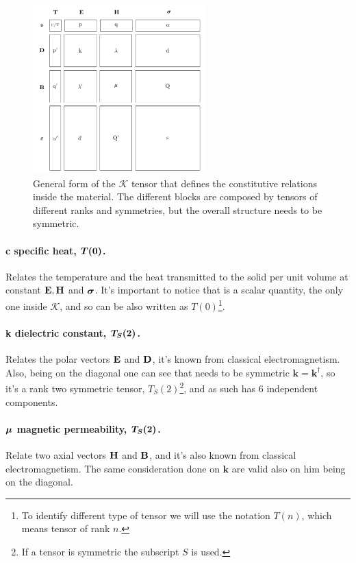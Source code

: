 \begin{figure}[t]
    \centering
    \includegraphics[width=0.6\textwidth]{Immagini/TabellaK.pdf}
    \caption{
        General form of the $\mathcal{K}$ tensor that defines the constitutive relations inside the material. The different blocks are composed by tensors of different ranks and symmetries, but the overall structure needs to be symmetric.
    }
    \label{fig:tensorK}
\end{figure}

\paragraph{c specific heat, $\vb*{T(0)}$.} Relates the temperature and the heat transmitted to the solid per unit volume at constant $\vb{E}, \vb{H}$ and $\vb*{\sigma}$. It's important to notice that is a scalar quantity, the only one inside $\mathcal{K}$, and so can be also written as $T(0)$\footnote{To identify different type of tensor we will use the notation $T(n)$, which means tensor of rank $n$.}.

\paragraph{k dielectric constant, $\vb*{T_S(2)}$.} Relates the polar vectors $\vb{E}$ and $\vb{D}$, it's known from classical electromagnetism. Also, being on the diagonal one can see that needs to be symmetric $\mathbf{k} = \mathbf{k}^\dagger$, so it's a rank two symmetric tensor, $T_S(2)$\footnote{If a tensor is symmetric the subscript $S$ is used.}, and as such has $6$ independent components. 

\paragraph{$\vb*{\mu}$ magnetic permeability, $\vb*{T_S(2)}$.} Relate two axial vectors $\vb{H}$ and $\vb{B}$, and it's also known from classical electromagnetism. The same consideration done on $\mathbf{k}$ are valid also on him being on the diagonal.

